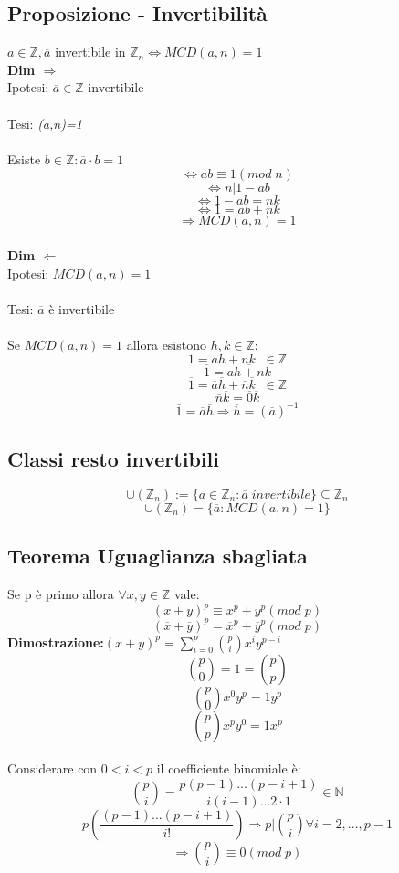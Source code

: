 \subsection{Proposizione - Invertibilità}
\(a\in\mathbb{Z}, \overline{a}\) invertibile in \(\mathbb{Z}_n\Leftrightarrow MCD(a,n)=1\)
\\
\textbf{Dim \(\Rightarrow\)}
\\Ipotesi: \(\overline{a}\in\mathbb{Z}\) invertibile
\\\\Tesi: \textit{(a,n)=1}
\\\\Esiste \(b\in\mathbb{Z}: \overline{a}\cdot\overline{b}=1\) 
\[\Leftrightarrow ab\equiv 1(mod\;n)\]
\[\Leftrightarrow n|1-ab\]
\[\Leftrightarrow  1-ab=nk\]
\[\Leftrightarrow 1=ab+nk\]
\[\Rightarrow MCD(a,n)=1 \]
\\
\textbf{Dim \(\Leftarrow\)} 
\\Ipotesi: \(MCD(a,n)=1\)
\\\\Tesi: \(\overline{a}\) è invertibile
\\\\Se \(MCD(a,n)=1\) allora esistono \(h,k\in\mathbb{Z}:\)
\[1=ah+nk\;\;\in\mathbb{Z}\]
\[\overline{1}=\overline{ah+nk}\]
\[\overline{1}=\overline{a}\overline{h}+\overline{n}\overline{k}\;\;\in\mathbb{Z}\]
\[\overline{n}\overline{k}=\overline{0}\overline{k}\]
\[\overline{1}=\overline{a}\overline{h}\Rightarrow\overline{h}=(\overline{a})^{-1}\]

\subsection{Classi resto invertibili}
\[\cup (\mathbb{Z}_n):=\{a\in\mathbb{Z}_n:\overline{a}\;invertibile\}\subseteq\mathbb{Z}_n\]
\[\cup (\mathbb{Z}_n)=\{\overline{a}: MCD(a,n)=1\}\]

\subsection{Teorema Uguaglianza sbagliata}
Se p è primo allora \(\forall x,y\in\mathbb{Z}\) vale:
\[(x+y)^p\equiv x^p+y^p(mod\;p)\]
\[(\overline{x}+\overline{y})^p=\overline{x}^p+\overline{y}^p(mod\;p)\]
\textbf{Dimostrazione:}\((x+y)^p=\sum ^p_{i=0}\binom{p}{i}x^iy^{p-i}\)
\[\binom{p}{0}=1=\binom{p}{p}\]
\[\binom{p}{0}x^0y^p=1y^p\]
\[\binom{p}{p}x^py^0=1x^p\]
\\
Considerare con \(0<i<p\) il coefficiente binomiale è:
\[\binom{p}{i}=\frac{p(p-1)...(p-i+1)}{i(i-1)...2\cdot 1}\in\mathbb{N}\]
\[p(\frac{(p-1)...(p-i+1)}{i!})\Rightarrow p|\binom{p}{i}\forall i=2,...,p-1\]
\[\Rightarrow\binom{p}{i}\equiv 0(mod\;p)\]

